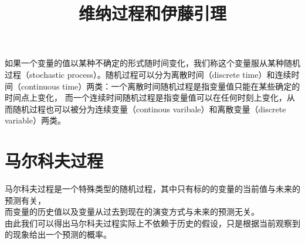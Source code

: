 \documentclass[a4paper]{article}
\title{维纳过程和伊藤引理}
\author{}
\begin{document}
\maketitle{}
\begin{center}
如果一个变量的值以某种不确定的形式随时间变化，我们称这个变量服从某种随机过程（stochastic process）。随机过程可以分为离散时间（discrete time）和连续时间（continuous time）两类：一个离散时间随机过程是指变量值只能在某些确定的时间点上变化，
而一个连续时间随机过程是指变量值可以在任何时刻上变化，从而随机过程也可以被分为连续变量（continous varibale）和离散变量（discrete variable）两类。
\end{center}
\section{马尔科夫过程}
马尔科夫过程是一个特殊类型的随机过程，其中只有标的的变量的当前值与未来的预测有关，\\
而变量的历史值以及变量从过去到现在的演变方式与未来的预测无关。\\
由此我们可以得出马尔科夫过程实际上不依赖于历史的假设，只是根据当前观察到的现象给出一个预测的概率。\\
\end{document}
